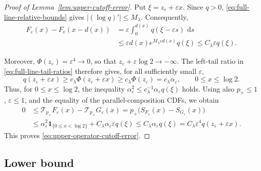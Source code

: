 \documentclass[a4paper,fleqn]{cas-sc}
\newif\ifshowrevisions
\DeclareRobustCommand{\rev}[1]{{\ifshowrevisions\color{blue}\fi#1}}
\numberwithin{equation}{section}
\theoremstyle{plain}
\theoremstyle{definition}
\newcommand{\ind}{\mathbf 1}
\newcommand{\dd}{\,\mathrm d}
\begin{document}
\begin{proof}[Proof of Lemma~\ref{lem:upper-cutoff-error}]
Put $\xi=z_\varepsilon+\varepsilon x$.  Since $q>0$,
\eqref{eq:full-line-relative-bounds} gives
$|(\log q)'|\le M_\lambda$.  Consequently,
\[
\begin{aligned}
 F_\varepsilon(x)-F_\varepsilon(x-d(x))
 &=\varepsilon\int_0^{d(x)}q(\xi-\varepsilon s)\,\dd s\\
 &\le\varepsilon d(x)e^{M_\lambda\varepsilon d(x)}q(\xi)
 \le C_\lambda\varepsilon q(\xi).
\end{aligned}
\]

Moreover, $\Phi(z_\varepsilon)=\varepsilon^4\to0$, so that
$z_\varepsilon+\varepsilon\log2\to-\infty$.  The left-tail ratio in
\eqref{eq:full-line-tail-ratios} therefore gives, for all sufficiently
small $\varepsilon$,
\[
 q(z_\varepsilon+\varepsilon x)
 \ge c_\lambda\Phi(z_\varepsilon+\varepsilon x)
 \ge c_\lambda\Phi(z_\varepsilon)
 =c_\lambda\alpha_\varepsilon,
 \qquad 0\le x\le\log2.
\]
Thus, for $0\le x\le\log2$, the inequality
$\alpha_\varepsilon^2\le
c_\lambda^{-1}\alpha_\varepsilon q(\xi)$ holds.  Using also
$p_+\le1$, $\varepsilon\le1$, and the equality of the \rev{parallel-composition}
CDFs, we obtain
\[
\begin{aligned}
 0
 &\le \mathcal T_{p_+}F_\varepsilon(x)
       -\mathcal T_{p_+}G_\varepsilon(x)
 =p_+\bigl(S_{F_\varepsilon}(x)-S_{G_\varepsilon}(x)\bigr)\\
 &\le \alpha_\varepsilon^2\ind_{\{0\le x<\log2\}}
       +C_\lambda\alpha_\varepsilon\varepsilon q(\xi)
 \le C_\lambda\alpha_\varepsilon q(\xi)
 =C_\lambda\varepsilon^4q(z_\varepsilon+\varepsilon x).
\end{aligned}
\]
This proves \eqref{eq:upper-operator-cutoff-error}.
\end{proof}
\subsection{Lower bound}
\end{document}
